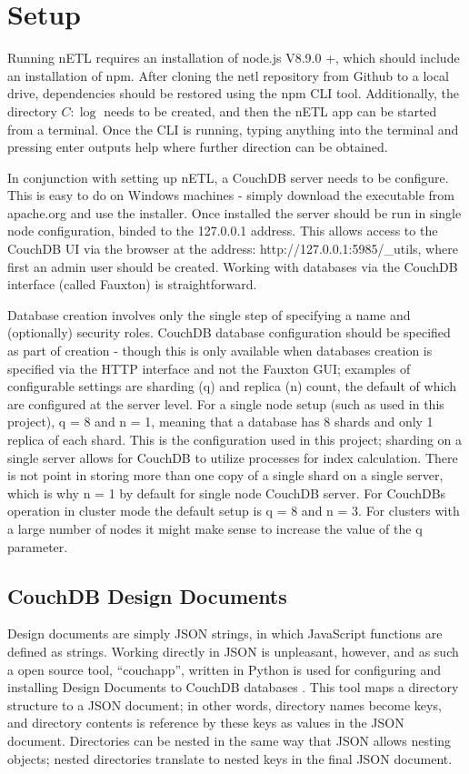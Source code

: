 \section{Setup}
Running nETL requires an installation of node.js V8.9.0 +, which should include an installation of npm. After cloning the netl repository from Github to a local drive, dependencies should be restored using the npm CLI tool. Additionally, the directory $C:\log$ needs to be created, and then the nETL app can be started from a terminal. Once the CLI is running, typing anything into the terminal and pressing enter outputs help where further direction can be obtained.

In conjunction with setting up nETL, a CouchDB server needs to be configure. This is easy to do on Windows machines - simply download the executable from apache.org and use the installer. Once installed the server should be run in single node configuration, binded to the 127.0.0.1 address. This allows access to the CouchDB UI via the browser at the address: http://127.0.0.1:5985/\_utils, where first an admin user should be created. Working with databases via the CouchDB interface (called Fauxton) is straightforward.

Database creation involves only the single step of specifying a name and (optionally) security roles. CouchDB database configuration should be specified as part of creation - though this is only available when databases creation is specified via the HTTP interface and not the Fauxton GUI; examples of configurable settings are sharding (q) and replica (n) count, the default of which are configured at the server level. For a single node setup (such as used in this project), q = 8 and n = 1, meaning that a database has 8 shards and only 1 replica of each shard. This is the configuration used in this project; sharding on a single server allows for CouchDB to utilize processes for index calculation. There is not point in storing more than one copy of a single shard on a single server, which is why n = 1 by default for single node CouchDB server. For CouchDBs operation in cluster mode the default setup is q = 8 and n = 3. For clusters with a large number of nodes it might make sense to increase the value of the q parameter.

\subsection{CouchDB Design Documents}
Design documents are simply JSON strings, in which JavaScript functions are defined as strings. Working directly in JSON is unpleasant, however, and as such a open source tool, ``couchapp'', written in Python is used for configuring and installing Design Documents to CouchDB databases \cite{pythonCouchapp}. This tool maps a directory structure to a JSON document; in other words, directory names become keys, and directory contents is reference by these keys as values in the JSON document. Directories can be nested in the same way that JSON allows nesting objects; nested directories translate to nested keys in the final JSON document.

